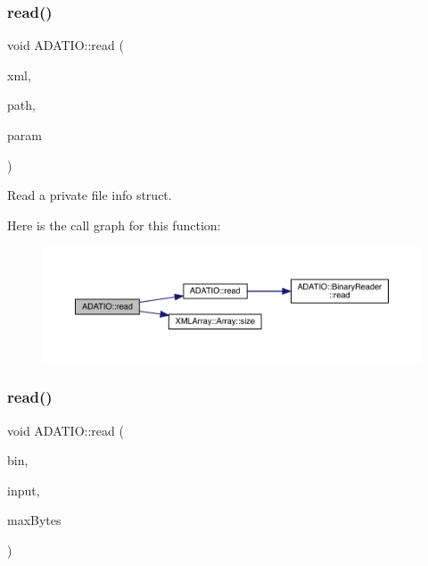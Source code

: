 \subsubsection{\texorpdfstring{read()}{read()}\hspace{0.1cm}{\footnotesize\ttfamily [1/28]}}
{\footnotesize\ttfamily void A\+D\+A\+T\+I\+O\+::read (\begin{DoxyParamCaption}\item[{\mbox{\hyperlink{classADATXML_1_1XMLReader}{X\+M\+L\+Reader}} \&}]{xml,  }\item[{const std\+::string \&}]{path,  }\item[{\mbox{\hyperlink{structADATIO_1_1QIOFileInfo__t}{Q\+I\+O\+File\+Info\+\_\+t}} \&}]{param }\end{DoxyParamCaption})}



Read a private file info struct. 

Here is the call graph for this function\+:\nopagebreak
\begin{figure}[H]
\begin{center}
\leavevmode
\includegraphics[width=350pt]{d0/dba/namespaceADATIO_ac8ef7ea6a40421510ad5578b6fad884e_cgraph}
\end{center}
\end{figure}
\mbox{\label{namespaceADATIO_ab1b78a1922de3cc047517ead7aa99825}} 
\subsubsection{\texorpdfstring{read()}{read()}\hspace{0.1cm}{\footnotesize\ttfamily [2/28]}}
{\footnotesize\ttfamily void A\+D\+A\+T\+I\+O\+::read (\begin{DoxyParamCaption}\item[{\mbox{\hyperlink{classADATIO_1_1BinaryReader}{Binary\+Reader}} \&}]{bin,  }\item[{std\+::string \&}]{input,  }\item[{size\+\_\+t}]{max\+Bytes }\end{DoxyParamCaption})}

